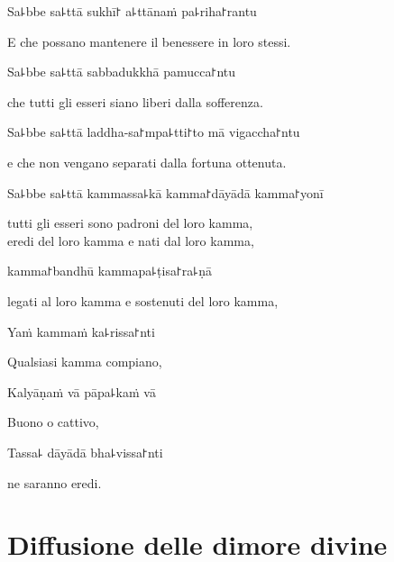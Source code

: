 Sa꜕bbe sa꜕ttā sukhī꜓ a꜕ttānaṁ pa꜕riha꜓rantu
  \begin{english} 
E che possano mantenere il benessere in loro stessi.
  \end{english}

Sa꜕bbe sa꜕ttā sabbadukkhā pamucca꜓ntu
  \begin{english} 
che tutti gli esseri siano liberi dalla sofferenza.
  \end{english}

Sa꜕bbe sa꜕ttā laddha-sa꜓mpa꜕tti꜓to mā vigaccha꜓ntu

  \begin{english}
    e che non vengano separati dalla fortuna ottenuta.
  \end{english}

Sa꜕bbe sa꜕ttā kammassa꜕kā kamma꜓dāyādā kamma꜓yonī\\
  \begin{english}
tutti gli esseri sono padroni del loro kamma,\\
 eredi del loro kamma e nati dal loro kamma,
  \end{english}

kamma꜓bandhū kammapa꜕ṭisa꜓ra꜕ṇā\\
  \begin{english}
    legati al loro kamma e sostenuti del loro kamma,
  \end{english} 
    Yaṁ kammaṁ ka꜕rissa꜓nti\\

  \begin{english}
Qualsiasi kamma compiano,
  \end{english}

Kalyāṇaṁ vā pāpa꜕kaṁ vā\\

  \begin{english}
Buono o cattivo,
  \end{english}

Tassa꜕ dāyādā bha꜕vissa꜓nti

  \begin{english}
ne saranno eredi.
  \end{english}

\chapter[Dimore divine]{Diffusione delle dimore divine}


\delegateSetUseNext

